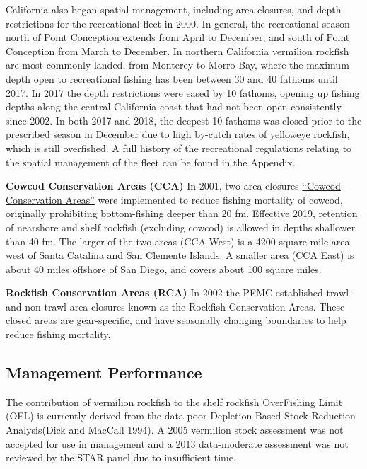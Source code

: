 \documentclass[
  english,
  a4paper,
]{article}
\begin{document}
California also began spatial management, including area closures, and depth
restrictions for the recreational fleet in 2000. In general, the recreational
season north of Point Conception
extends from April to December, and south of Point Conception from March to December.
In northern California vermilion rockfish are most commonly landed, from Monterey to Morro Bay, where the
maximum depth open to recreational fishing has been between 30 and 40
fathoms until 2017. In 2017 the depth restrictions were eased by 10 fathoms,
opening up fishing depths along the central California coast that had not been
open consistently since 2002. In
both 2017 and 2018, the deepest 10 fathoms was closed prior to the prescribed
season in December due to high by-catch rates of yelloweye rockfish, which is still
overfished. A full history of the recreational
regulations relating to the spatial management of the fleet can be found in the Appendix.

\textbf{Cowcod Conservation Areas (CCA)}
In 2001, two area closures \href{https://nrm.dfg.ca.gov/FileHandler.ashx?DocumentID=36132\&inline}{``Cowcod Conservation Areas''} were implemented to reduce fishing mortality of cowcod, originally prohibiting bottom-fishing deeper than 20 fm. Effective 2019, retention of nearshore and shelf rockfish (excluding cowcod) is allowed in depths shallower than 40 fm. The larger of the two areas (CCA West) is a 4200 square mile area west of Santa Catalina and San Clemente Islands. A smaller area (CCA East) is about 40 miles offshore of San Diego, and covers about 100 square miles.

\textbf{Rockfish Conservation Areas (RCA)}
In 2002 the PFMC established trawl- and non-trawl area closures known as the Rockfish Conservation Areas. These closed areas are gear-specific, and have seasonally changing boundaries to help reduce fishing mortality.

\hypertarget{management-performance-1}{%
\subsection{Management Performance}\label{management-performance-1}}

The contribution of vermilion rockfish to the shelf rockfish OverFishing Limit (OFL) is currently derived from the data-poor Depletion-Based Stock Reduction Analysis(Dick and MacCall 1994). A 2005
vermilion stock assessment was not accepted for use in management and a 2013 data-moderate assessment was not reviewed by the STAR panel due to insufficient time.
\end{document}
